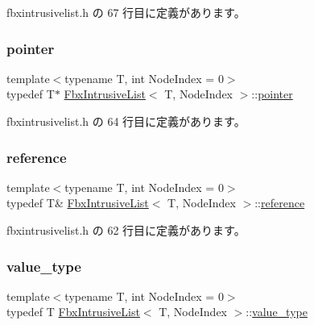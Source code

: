  fbxintrusivelist.\+h の 67 行目に定義があります。

\mbox{\label{class_fbx_intrusive_list_ad04ad10d67ddd0d4104b172839c908d7}} 
\subsubsection{\texorpdfstring{pointer}{pointer}}
{\footnotesize\ttfamily template$<$typename T, int Node\+Index = 0$>$ \\
typedef T$\ast$ \hyperlink{class_fbx_intrusive_list}{Fbx\+Intrusive\+List}$<$ T, Node\+Index $>$\+::\hyperlink{class_fbx_intrusive_list_ad04ad10d67ddd0d4104b172839c908d7}{pointer}}



 fbxintrusivelist.\+h の 64 行目に定義があります。

\mbox{\label{class_fbx_intrusive_list_aa927f048081371fe74dff673d3a5a8ad}} 
\subsubsection{\texorpdfstring{reference}{reference}}
{\footnotesize\ttfamily template$<$typename T, int Node\+Index = 0$>$ \\
typedef T\& \hyperlink{class_fbx_intrusive_list}{Fbx\+Intrusive\+List}$<$ T, Node\+Index $>$\+::\hyperlink{class_fbx_intrusive_list_aa927f048081371fe74dff673d3a5a8ad}{reference}}



 fbxintrusivelist.\+h の 62 行目に定義があります。

\mbox{\label{class_fbx_intrusive_list_a218aebbf21a304ade2a570f47da62751}} 
\subsubsection{\texorpdfstring{value\+\_\+type}{value\_type}}
{\footnotesize\ttfamily template$<$typename T, int Node\+Index = 0$>$ \\
typedef T \hyperlink{class_fbx_intrusive_list}{Fbx\+Intrusive\+List}$<$ T, Node\+Index $>$\+::\hyperlink{class_fbx_intrusive_list_a218aebbf21a304ade2a570f47da62751}{value\+\_\+type}}



